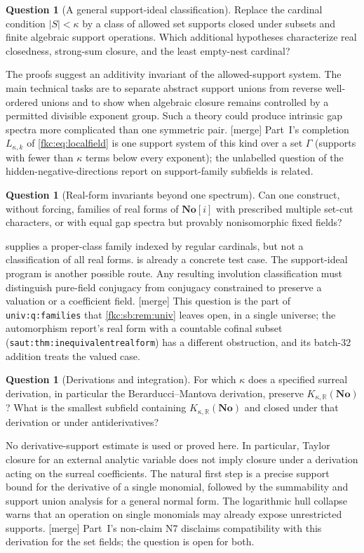 \documentclass[11pt,letterpaper]{article}
\numberwithin{equation}{section}
\theoremstyle{definition}
\newtheorem{question}[theorem]{Question}
\theoremstyle{remark}
\newcommand{\R}{\mathbb R}
\newcommand{\No}{\mathbf{No}}
\newcommand{\mergetag}{\textup{\textsf{\small[merge]}}}%
\newcommand{\SC}{\mathbf{No}[i]}
\newcommand{\card}[1]{\lvert #1\rvert}
\newcommand{\KN}[2]{K_{#1,#2}(\No)}%
\newcommand{\lbl}[1]{\nolinkurl{#1}}%
\begin{document}
\begin{question}[A general support-ideal classification]\label{fkc:sb:q:supportideal}
Replace the cardinal condition $\card S<\kappa$ by a class of allowed set supports closed under subsets and finite algebraic support operations. Which additional hypotheses characterize real closedness, strong-sum closure, and the least empty-nest cardinal?
\end{question}
The proofs suggest an additivity invariant of the allowed-support system. The main technical tasks are to separate abstract support unions from reverse well-ordered unions and to show when algebraic closure remains controlled by a permitted divisible exponent group. Such a theory could produce intrinsic gap spectra more complicated than one symmetric pair. \mergetag{} Part~I's completion $L_{\kappa,k}$ of \eqref{fkc:eq:localfield} is one support system of this kind over a set $\Gamma$ (supports with fewer than $\kappa$ terms below every exponent); the unlabelled question of the hidden-negative-directions report on support-family subfields is related.

\begin{question}[Real-form invariants beyond one spectrum]\label{fkc:sb:q:realforms}
Can one construct, without forcing, families of real forms of $\SC$ with prescribed multiple set-cut characters, or with equal gap spectra but provably nonisomorphic fixed fields?
\end{question}
 supplies a proper-class family indexed by regular cardinals, but not a classification of all real forms.  is already a concrete test case. The support-ideal program is another possible route. Any resulting involution classification must distinguish pure-field conjugacy from conjugacy constrained to preserve a valuation or a coefficient field. \mergetag{} This question is the part of \lbl{univ:q:families} that \cref{fkc:sb:rem:univ} leaves open, in a single universe; the automorphism report's real form with a countable cofinal subset (\lbl{saut:thm:inequivalentrealform}) has a different obstruction, and its batch-32 addition treats the valued case.

\begin{question}[Derivations and integration]\label{fkc:sb:q:derivations}
For which $\kappa$ does a specified surreal derivation, in particular the Berarducci--Mantova derivation, preserve $\KN\kappa\R$? What is the smallest subfield containing $\KN\kappa\R$ and closed under that derivation or under antiderivatives?
\end{question}
No derivative-support estimate is used or proved here. In particular, Taylor closure for an external analytic variable does not imply closure under a derivation acting on the surreal coefficients. The natural first step is a precise support bound for the derivative of a single monomial, followed by the summability and support union analysis for a general normal form. The logarithmic hull collapse warns that an operation on single monomials may already expose unrestricted supports. \mergetag{} Part~I's non-claim N7 disclaims compatibility with this derivation for the set fields; the question is open for both.
\end{document}
